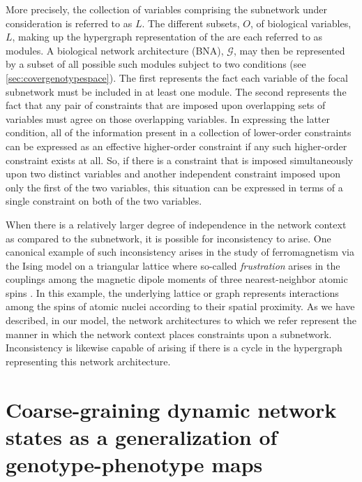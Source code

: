 More precisely, the collection of variables comprising the subnetwork under consideration is referred to as $L$. The different subsets, $O$, of biological variables, $L$, making up the hypergraph representation of the \AI{} are each referred to as modules. A biological network architecture (BNA), $\mathcal{G}$, may then be represented by a subset of all possible such modules subject to two conditions (see  \ref{sec:covergenotypespace}). The first represents the fact each variable of the focal subnetwork must be included in at least one module. The second represents the fact that any pair of constraints that are imposed upon overlapping sets of variables must agree on those overlapping variables.  In expressing the latter condition, all of the information present in a collection of lower-order constraints can be expressed as an effective higher-order constraint if any such higher-order constraint exists at all. So, if there is a constraint that is imposed simultaneously upon two distinct variables and another independent constraint imposed upon only the first of the two variables, this situation can be expressed in terms of a single constraint on both of the two variables.

When there is a relatively larger degree of independence in the network context as compared to the subnetwork, it is possible for inconsistency to arise. One canonical example of such inconsistency arises in the study of ferromagnetism via the Ising model on a triangular lattice where so-called \emph{frustration} arises in the couplings among the magnetic dipole moments of three nearest-neighbor atomic spins \cite{Wannier1950,Toulouse1977,Vannimenus1977}. In this example, the underlying lattice or graph represents interactions among the spins of atomic nuclei according to their spatial proximity. As we have described, in our model, the network architectures to which we refer represent the manner in which the network context places constraints upon a subnetwork. Inconsistency is likewise capable of arising if there is a cycle in the hypergraph representing this network architecture.

\section{Coarse-graining dynamic network states as a generalization of genotype-phenotype maps}\label{sec:genenetworkphenmap}

